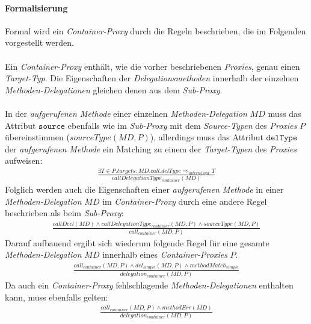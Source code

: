 \paragraph{Formalisierung}
Formal wird ein \emph{Container-Proxy} durch die Regeln beschrieben, die im Folgenden vorgestellt werden.
\\\\
Ein \emph{Container-Proxy} enthält, wie die vorher beschriebenen \emph{Proxies}, genau einen \emph{Target-Typ}. Die Eigenschaften der \emph{Delegationsmethoden} innerhalb der einzelnen \emph{Methoden-Delegationen} gleichen denen aus dem \emph{Sub-Proxy}.
\\\\
In der \emph{aufgerufenen Methode} einer einzelnen \emph{Methoden-Delegation} $\mathit{MD}$ muss das Attribut $\texttt{source}$ ebenfalls wie im \emph{Sub-Proxy} mit dem \emph{Source-Typen} des \emph{Proxies} $P$ übereinstimmen ($\mathit{sourceType(MD,P)}$), allerdings muss das Attribut $\texttt{delType}$ der \emph{aufgerufenen Methode} ein Matching zu einem der \emph{Target-Typen} des \emph{Proxies} aufweisen:
\begin{gather*}
\frac{\exists T \in \mathit{P.targets}:\mathit{MD.call.delType} \Rightarrow_{internCont} T}
{\mathit{callDelegationType_{container}(MD)}}
\end{gather*}
\noindent
Folglich werden auch die Eigenschaften einer \emph{aufgerufenen Methode} in einer \emph{Methoden-Delegation} $\mathit{MD}$ im \emph{Container-Proxy} durch eine andere Regel beschrieben als beim \emph{Sub-Proxy}:
\begin{gather*}
\frac{\mathit{callDecl(MD)} \wedge \mathit{callDelegationType_{container}(MD,P)} \wedge \mathit{sourceType(MD,P)}}
{\mathit{call_{container}(MD,P)}}
\end{gather*}
\noindent
Darauf aufbauend ergibt sich wiederum folgende Regel für eine gesamte \emph{Methoden-Delegation} $\mathit{MD}$ innerhalb eines \emph{Container-Proxies} $P$.
\begin{gather*}
\frac{\mathit{call_{container}(MD, P)} \wedge \mathit{del_{simple}(MD, P)} \wedge \mathit{methodMatch_{simple}}}
{\mathit{delegation_{container}(MD, P)}}
\end{gather*}
\noindent
Da auch ein \emph{Container-Proxy} fehlschlagende \emph{Methoden-Delegationen} enthalten kann, muss ebenfalls gelten:
\begin{gather*}
\frac{\mathit{call_{container}(MD, P)} \wedge \mathit{methodErr(MD)}}
{\mathit{delegation_{container}(MD, P)}}
\end{gather*}
